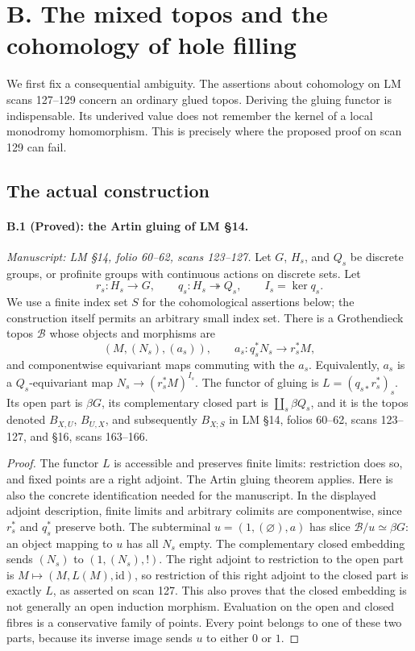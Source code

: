 \section{B. The mixed topos and the cohomology of hole filling}\label{part:B}

We first fix a consequential ambiguity. The assertions about cohomology on
LM scans 127--129 concern an ordinary glued topos. Deriving the gluing
functor is indispensable. Its underived value does not remember the kernel
of a local monodromy homomorphism. This is precisely where the proposed
proof on scan 129 can fail.

\subsection{The actual construction}

\paragraph{B.1 (Proved): the Artin gluing of LM \S14.}\label{B1}
\textit{Manuscript: LM \S14, folio 60--62, scans 123--127.}
Let $G$, $H_s$, and $Q_s$ be discrete groups, or profinite groups with
continuous actions on discrete sets. Let
\[
 r_s:H_s\longrightarrow G,\qquad q_s:H_s\twoheadrightarrow Q_s,
 \qquad I_s=\ker q_s.
\]
We use a finite index set $S$ for the cohomological assertions below;
the construction itself permits an arbitrary small index set. There is a
Grothendieck topos $\mathcal B$ whose objects and morphisms are
\[
 (M,(N_s), (a_s)),\qquad
 a_s:q_s^*N_s\longrightarrow r_s^*M,
\]
and componentwise equivariant maps commuting with the $a_s$.
Equivalently, $a_s$ is a $Q_s$-equivariant map
$N_s\to(r_s^*M)^{I_s}$. The functor of gluing is
$L=(q_{s*}r_s^*)_s$. Its open part is $\beta G$, its complementary
closed part is $\coprod_s\beta Q_s$, and it is the topos denoted
$B_{X,U}$, $B_{U,X}$, and subsequently $B_{X;S}$ in LM
\S14, folios 60--62, scans 123--127, and \S16, scans 163--166.

\begin{proof}
The functor $L$ is accessible and preserves finite limits: restriction
does so, and fixed points are a right adjoint. The Artin gluing theorem
\citep[IV, Th\'eor\`eme 9.5.4]{SGA4} applies. Here is also the concrete
identification needed for the manuscript. In the displayed adjoint
description, finite limits and arbitrary colimits are componentwise,
since $r_s^*$ and $q_s^*$ preserve both. The subterminal
$u=(1,(\varnothing),a)$ has slice $\mathcal B/u\simeq\beta G$:
an object mapping to $u$ has all $N_s$ empty. The complementary closed
embedding sends $(N_s)$ to $(1,(N_s),!)$. The right adjoint to restriction
to the open part is $M\mapsto(M,L(M),\mathrm{id})$, so restriction of
this right adjoint to the closed part is exactly $L$, as asserted on
scan 127. This also proves that the closed embedding is not generally an
open induction morphism. Evaluation on the open and closed fibres is a
conservative family of points. Every point belongs to one of these two
parts, because its inverse image sends $u$ to either $0$ or $1$.
\end{proof}

